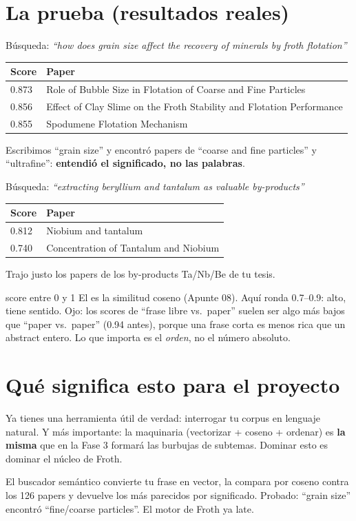 \documentclass[11pt,a4paper]{article}
\begin{document}
\section{La prueba (resultados reales)}

Búsqueda: \emph{``how does grain size affect the recovery of minerals by froth flotation''}
\begin{center}
\begin{tabular}{ll}
\textbf{Score} & \textbf{Paper} \\
\hline
0.873 & Role of Bubble Size in Flotation of Coarse and Fine Particles \\
0.856 & Effect of Clay Slime on the Froth Stability and Flotation Performance \\
0.855 & Spodumene Flotation Mechanism \\
\end{tabular}
\end{center}
Escribimos ``grain size'' y encontró papers de ``coarse and fine particles'' y ``ultrafine'':
\textbf{entendió el significado, no las palabras}.

Búsqueda: \emph{``extracting beryllium and tantalum as valuable by-products''}
\begin{center}
\begin{tabular}{ll}
\textbf{Score} & \textbf{Paper} \\
\hline
0.812 & Niobium and tantalum \\
0.740 & Concentration of Tantalum and Niobium \\
\end{tabular}
\end{center}
Trajo justo los papers de los by-products Ta/Nb/Be de tu tesis.

\begin{concepto}{score entre 0 y 1}
El  es la similitud coseno (Apunte 08). Aquí ronda 0.7--0.9: alto, tiene
sentido. Ojo: los scores de ``frase libre vs.\ paper'' suelen ser algo más bajos que
``paper vs.\ paper'' (0.94 antes), porque una frase corta es menos rica que un abstract
entero. Lo que importa es el \emph{orden}, no el número absoluto.
\end{concepto}

\section{Qué significa esto para el proyecto}

Ya tienes una herramienta útil de verdad: interrogar tu corpus en lenguaje natural. Y más
importante: la maquinaria (vectorizar + coseno + ordenar) es \textbf{la misma} que en la
Fase 3 formará las burbujas de subtemas. Dominar esto es dominar el núcleo de Froth.

\begin{resumen}
El buscador semántico convierte tu frase en vector, la compara por coseno contra los 126
papers y devuelve los más parecidos por significado. Probado: ``grain size'' encontró
``fine/coarse particles''. El motor de Froth ya late.
\end{resumen}
\end{document}
